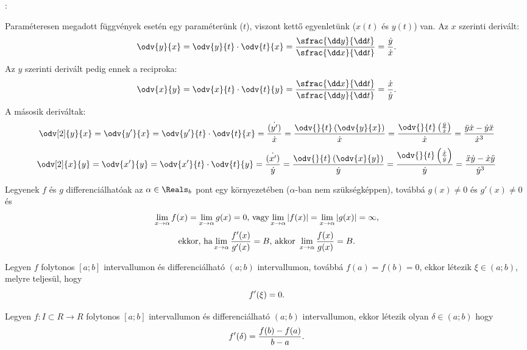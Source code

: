 \documentclass[a4paper, 12pt]{scrartcl}
\begin{document}
\begin{blueBox}
  :

  Paraméteresen megadott függvények esetén egy paraméterünk ($t$), viszont kettő
  egyenletünk ($x(t)$ és $y(t)$) van. Az $x$ szerinti derivált:
  \[
    \odv{y}{x}
    = \odv{y}{t} \cdot \odv{t}{x}
    = \frac{\sfrac{\dd y}{\dd t}}{\sfrac{\dd x}{\dd t}}
    = \frac{\dot y}{\dot x}
    \text.
  \]
  Az $y$ szerinti derivált pedig ennek a reciproka:
  \[
    \odv{x}{y}
    = \odv{x}{t} \cdot \odv{t}{y}
    = \frac{\sfrac{\dd x}{\dd t}}{\sfrac{\dd y}{\dd t}}
    = \frac{\dot x}{\dot y}
    \text.
  \]
  A másosik deriváltak:
  \[
    \odv[2]{y}{x}
    = \odv{y'}{x}
    = \odv{y'}{t} \cdot \odv{t}{x}
    = \frac{\dot{(y')}}{\dot x}
    = \frac{\odv{}{t}\left(\odv{y}{x}\right)}{\dot x}
    = \frac{\odv{}{t}\left(\frac{\dot y}{\dot x}\right)}{\dot x}
    = \frac{\ddot y \dot x - \dot y \ddot x}{\dot x^3}
  \]
  \[
    \odv[2]{x}{y}
    = \odv{x'}{y}
    = \odv{x'}{t} \cdot \odv{t}{y}
    = \frac{\dot{(x')}}{\dot y}
    = \frac{\odv{}{t}\left(\odv{x}{y}\right)}{\dot y}
    = \frac{\odv{}{t}\left(\frac{\dot x}{\dot y}\right)}{\dot y}
    = \frac{\ddot x \dot y - \dot x \ddot y}{\dot y^3}
  \]
\end{blueBox}

\begin{theorem}
  Legyenek $f$ és $g$ differenciálhatóak az $\alpha \in \Reals_b$ pont egy
  környezetében ($\alpha$-ban nem szükségképpen), továbbá $g(x) \neq 0$ és
  $g'(x) \neq 0$ és
  \[
    \lim\limits_{x \rightarrow \alpha} f(x) = \lim\limits_{x \rightarrow \alpha} g(x)=0
    \text{, vagy}
    \lim\limits_{x \rightarrow \alpha} |f(x)|=\lim\limits_{x \rightarrow \alpha}|g(x)|=\infty
    \text,
  \]
  \[
    \text{ekkor, ha}
    \lim\limits_{x \rightarrow \alpha} \frac{f'(x)}{g'(x)}=B
    \text{, akkor }
    \lim\limits_{x \rightarrow \alpha} \frac{f(x)}{g(x)}=B
    \text.
  \]
\end{theorem}

\begin{theorem}
  Legyen $f$ folytonos $[a; b]$ intervallumon és differenciálható $(a; b)$
  intervallumon, továbbá $f(a) = f(b) = 0$, ekkor létezik $ \xi \in (a; b)$,
  melyre teljesül, hogy
  \[
    f'(\xi) = 0
    \text.
  \]
\end{theorem}

\begin{theorem}
  Legyen $f : I \subset R \to R$ folytonos $[a; b]$ intervallumon és
  differenciálható $(a; b)$ intervallumon, ekkor létezik olyan $\delta \in
    (a; b)$ hogy
  \[
    f'(\delta) = \frac{f(b)-f(a)}{b-a}
    \text.
  \]
\end{theorem}
\end{document}
